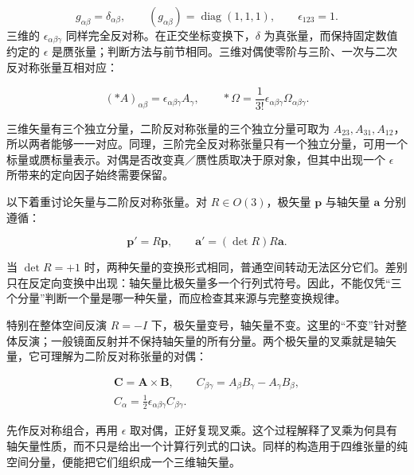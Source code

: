 \documentclass[a4paper,12pt]{article}
\begin{document}
\begin{equation}\label{euclidean}
g_{\alpha\beta}=\delta_{\alpha\beta},\qquad(g_{\alpha\beta})=\operatorname{diag}(1,1,1),\qquad\epsilon_{123}=1.
\end{equation}
三维的 $\epsilon_{\alpha\beta\gamma}$ 同样完全反对称。在正交坐标变换下，$\delta$ 为真张量，而保持固定数值约定的 $\epsilon$ 是赝张量；判断方法与前节相同。三维对偶使零阶与三阶、一次与二次反对称张量互相对应：

\begin{equation}\label{dual-three-space}
(*A)_{\alpha\beta}=\epsilon_{\alpha\beta\gamma}A_\gamma,\qquad *\Omega=\frac1{3!}\epsilon_{\alpha\beta\gamma}\Omega_{\alpha\beta\gamma}.
\end{equation}

三维矢量有三个独立分量，二阶反对称张量的三个独立分量可取为 $A_{23},A_{31},A_{12}$，所以两者能够一一对应。同理，三阶完全反对称张量只有一个独立分量，可用一个标量或赝标量表示。对偶是否改变真／赝性质取决于原对象，但其中出现一个 $\epsilon$ 所带来的定向因子始终需要保留。

以下着重讨论矢量与二阶反对称张量。对 $R\in O(3)$，极矢量 $\boldsymbol p$ 与轴矢量 $\boldsymbol a$ 分别遵循：

\begin{equation}\label{polar-axial}
\boldsymbol p'=R\boldsymbol p,\qquad\boldsymbol a'=(\det R)R\boldsymbol a.
\end{equation}

当 $\det R=+1$ 时，两种矢量的变换形式相同，普通空间转动无法区分它们。差别只在反定向变换中出现：轴矢量比极矢量多一个行列式符号。因此，不能仅凭“三个分量”判断一个量是哪一种矢量，而应检查其来源与完整变换规律。

特别在整体空间反演 $R=-I$ 下，极矢量变号，轴矢量不变。这里的“不变”针对整体反演；一般镜面反射并不保持轴矢量的所有分量。两个极矢量的叉乘就是轴矢量，它可理解为二阶反对称张量的对偶：

\begin{equation}\label{cross}
\begin{gathered}\boldsymbol C=\boldsymbol A\times\boldsymbol B,\qquad C_{\beta\gamma}=A_\beta B_\gamma-A_\gamma B_\beta,\\C_\alpha=\frac12\epsilon_{\alpha\beta\gamma}C_{\beta\gamma}.\end{gathered}
\end{equation}

先作反对称组合，再用 $\epsilon$ 取对偶，正好复现叉乘。这个过程解释了叉乘为何具有轴矢量性质，而不只是给出一个计算行列式的口诀。同样的构造用于四维张量的纯空间分量，便能把它们组织成一个三维轴矢量。
\end{document}
